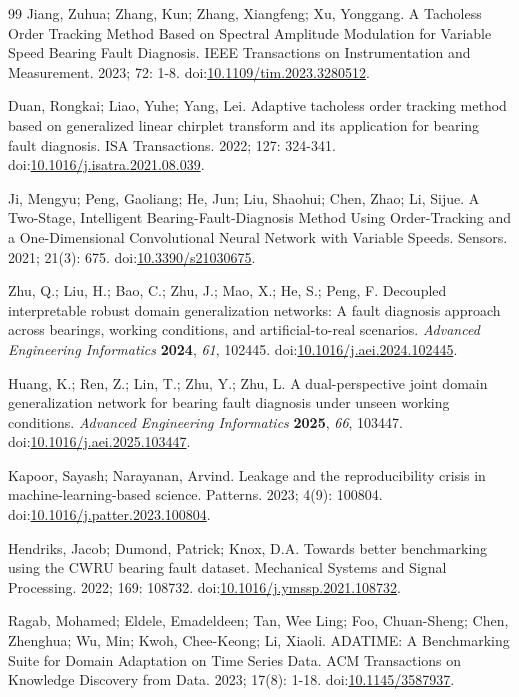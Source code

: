 \documentclass[11pt]{article}
\begin{document}
\begin{thebibliography}{99}
 Jiang, Zuhua; Zhang, Kun; Zhang, Xiangfeng; Xu, Yonggang. A Tacholess Order Tracking Method Based on Spectral Amplitude Modulation for Variable Speed Bearing Fault Diagnosis. IEEE Transactions on Instrumentation and Measurement. 2023; 72: 1-8. doi:\url{10.1109/tim.2023.3280512}.

 Duan, Rongkai; Liao, Yuhe; Yang, Lei. Adaptive tacholess order tracking method based on generalized linear chirplet transform and its application for bearing fault diagnosis. ISA Transactions. 2022; 127: 324-341. doi:\url{10.1016/j.isatra.2021.08.039}.

 Ji, Mengyu; Peng, Gaoliang; He, Jun; Liu, Shaohui; Chen, Zhao; Li, Sijue. A Two-Stage, Intelligent Bearing-Fault-Diagnosis Method Using Order-Tracking and a One-Dimensional Convolutional Neural Network with Variable Speeds. Sensors. 2021; 21(3): 675. doi:\url{10.3390/s21030675}.

 Zhu, Q.; Liu, H.; Bao, C.; Zhu, J.; Mao, X.; He, S.; Peng, F. Decoupled interpretable robust domain generalization networks: A fault diagnosis approach across bearings, working conditions, and artificial-to-real scenarios. \textit{Advanced Engineering Informatics} \textbf{2024}, \textit{61}, 102445. doi:\url{10.1016/j.aei.2024.102445}.

 Huang, K.; Ren, Z.; Lin, T.; Zhu, Y.; Zhu, L. A dual-perspective joint domain generalization network for bearing fault diagnosis under unseen working conditions. \textit{Advanced Engineering Informatics} \textbf{2025}, \textit{66}, 103447. doi:\url{10.1016/j.aei.2025.103447}.

 Kapoor, Sayash; Narayanan, Arvind. Leakage and the reproducibility crisis in machine-learning-based science. Patterns. 2023; 4(9): 100804. doi:\url{10.1016/j.patter.2023.100804}.

 Hendriks, Jacob; Dumond, Patrick; Knox, D.A. Towards better benchmarking using the CWRU bearing fault dataset. Mechanical Systems and Signal Processing. 2022; 169: 108732. doi:\url{10.1016/j.ymssp.2021.108732}.

 Ragab, Mohamed; Eldele, Emadeldeen; Tan, Wee Ling; Foo, Chuan-Sheng; Chen, Zhenghua; Wu, Min; Kwoh, Chee-Keong; Li, Xiaoli. ADATIME: A Benchmarking Suite for Domain Adaptation on Time Series Data. ACM Transactions on Knowledge Discovery from Data. 2023; 17(8): 1-18. doi:\url{10.1145/3587937}.


\end{thebibliography}
\end{document}
